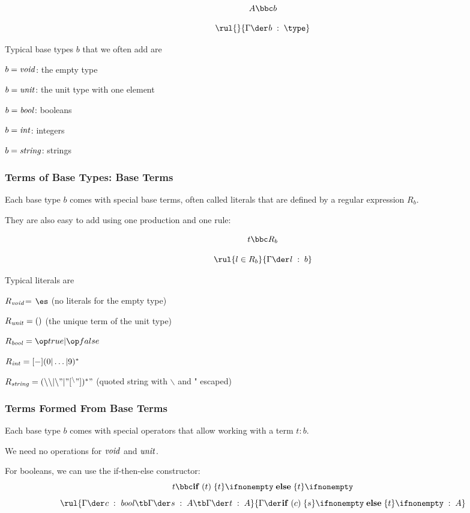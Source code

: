 \[A \bbc b\]

\[\rul{}{\oftype{}{\Gamma}{b}{\type}}\]

Typical base types $b$ that we often add are
\begin{compactitem}
 \item $b=\mathit{void}$: the empty type
 \item $b=\mathit{unit}$: the unit type with one element
 \item $b=\mathit{bool}$: booleans
 \item $b=\mathit{int}$: integers
 \item $b=\mathit{string}$: strings
\end{compactitem}

\subsubsection{Terms of Base Types: Base Terms}

Each base type $b$ comes with special base terms, often called literals that are defined by a regular expression $R_b$.

They are also easy to add using one production and one rule:

\[t \bbc R_b\]

\[\rul{l\in R_b}{\oftype{}{\Gamma}{l}{b}}\]

Typical literals are
\begin{compactitem}
 \item $R_{\mathit{void}}$= $\es$ (no literals for the empty type)
 \item $R_{\mathit{unit}}=()$ (the unique term of the unit type)
 \item $R_\Bool=\true|\false$
 \item $R_{\mathit{int}}=[-](0|\ldots|9)^*$
 \item $R_{\mathit{string}}=(\backslash\backslash | \backslash" | "[^\backslash"])^*"$ (quoted string with $\backslash$ and " escaped)
\end{compactitem}

\subsubsection{Terms Formed From Base Terms}

Each base type $b$ comes with special operators that allow working with a term $t:b$.

We need no operations for $\mathit{void}$ and $\mathit{unit}$.

For booleans, we can use the if-then-else constructor:
\[t \bbc \aifelseI{t}{t}{t}\]
\[\rul{\oftype{}{\Gamma}{c}{\Bool}\tb \oftype{}{\Gamma}{s}{A}\tb \oftype{}{\Gamma}{t}{A}}{\oftype{}{\Gamma}{\aifelseI{c}{s}{t}}{A}}\]

